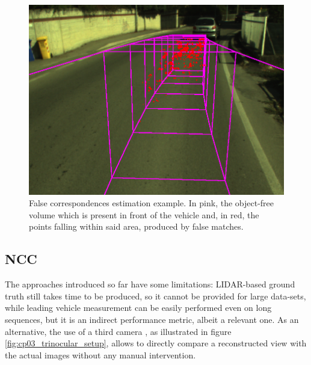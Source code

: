 \begin{figure}[h!]
\centering
\includegraphics{fc}
\caption{False correspondences estimation example. In pink, the object-free volume which is present in front of the vehicle and, in red, the points falling within said area, produced by false matches.}\label{fig:cp03_fc}
\end{figure}

\subsection{\acf{NCC}}\label{ch:chapter03_03}

The approaches introduced so far have some limitations: LIDAR-based ground truth still takes time to be produced, so it cannot be provided for large data-sets, while leading vehicle measurement can be easily performed even on long sequences, but it is an indirect performance metric, albeit a relevant one. As an alternative, the use of a third camera \citep{Morales2009}, as illustrated in figure \ref{fig:cp03_trinocular_setup}, allows to directly compare a reconstructed view with the actual images without any manual intervention. 

